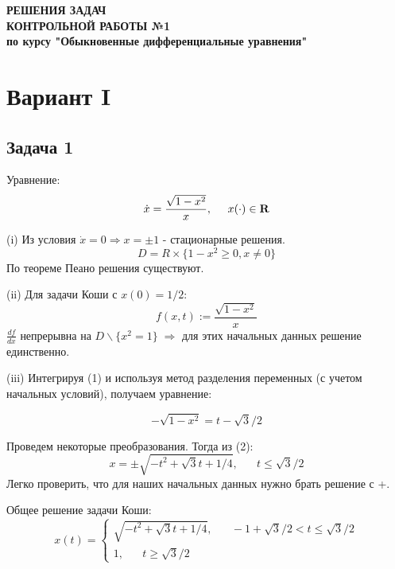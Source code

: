 \documentclass[a4paper, 12pt]{article}
\begin{document}
\begin{titlepage}
\begin{center}


\vfill






\textbf{РЕШЕНИЯ ЗАДАЧ \\[3mm]
КОНТРОЛЬНОЙ РАБОТЫ №1\\[3mm]
по курсу "Обыкновенные дифференциальные уравнения"
\\[20mm]
}
\end{center}


\tableofcontents

\end{titlepage}

\newpage




	\section{Вариант I}
		\subsection {Задача 1}


Уравнение:
\begin{equation}
\dot{x}=\frac{\sqrt{1-x^2}}{x}, \;\;\;\;\; x( \cdot ) \in \bf{R}
\end{equation}

(i) Из условия $\dot{x}=0 \Rightarrow x=\pm 1$ - стационарные решения. 
\[D = R \times \{1-x^2\geq 0, x \neq 0\} \]
По теореме Пеано решения существуют.

(ii) Для задачи Коши с $x(0)=1/2$:
\[f(x, t) := \frac{\sqrt{1-x^2}}{x}\]
$\frac {df}{dx}$ непрерывна на $D \backslash \{x^2=1\} \; \Rightarrow $ для этих начальных данных решение единственно. 

(iii) Интегрируя (1) и используя метод разделения переменных (с учетом начальных условий), получаем уравнение: 

\begin{equation}
	-\sqrt{1-x^2} = t - \sqrt{3}/2
\end{equation}

Проведем некоторые преобразования. Тогда из (2):
\[ x = \pm \sqrt{-t^2+\sqrt{3}t+1/4}, \;\;\;\;\;\; t\leq \sqrt{3}/2\]
Легко проверить, что для наших начальных данных нужно брать решение  с +.


Общее решение задачи Коши:
\begin{equation*}
x(t) = 
 \begin{cases}
   \sqrt{-t^2+\sqrt{3}t+1/4}, \;\;\;\;\;\;  -1+\sqrt{3}/2 < t\leq \sqrt{3}/2\\
   1, \;\;\;\;\;\; t\geq \sqrt{3}/2
 \end{cases}
\end{equation*}
\end{document}
